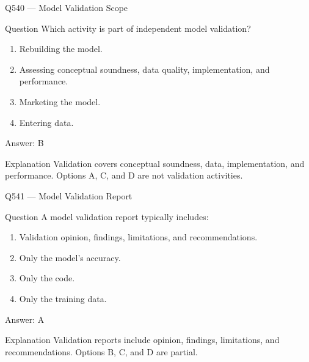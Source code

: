 \documentclass[aspectratio=169,8pt]{beamer}
\begin{document}
	\begin{frame}{Q540 --- Model Validation Scope}
		\begin{block}{Question}
			Which activity is part of independent model validation?
			\begin{enumerate}
				\item Rebuilding the model.
				\item Assessing conceptual soundness, data quality, implementation, and performance.
				\item Marketing the model.
				\item Entering data.
			\end{enumerate}
		\end{block}
		\begin{exampleblock}{Answer: B}\end{exampleblock}
		\begin{block}{Explanation}
			Validation covers conceptual soundness, data, implementation, and performance. Options A, C, and D are not validation activities.
		\end{block}
	\end{frame}
	
	\begin{frame}{Q541 --- Model Validation Report}
		\begin{block}{Question}
			A model validation report typically includes:
			\begin{enumerate}
				\item Validation opinion, findings, limitations, and recommendations.
				\item Only the model's accuracy.
				\item Only the code.
				\item Only the training data.
			\end{enumerate}
		\end{block}
		\begin{exampleblock}{Answer: A}\end{exampleblock}
		\begin{block}{Explanation}
			Validation reports include opinion, findings, limitations, and recommendations. Options B, C, and D are partial.
		\end{block}
	\end{frame}
	
\end{document}
